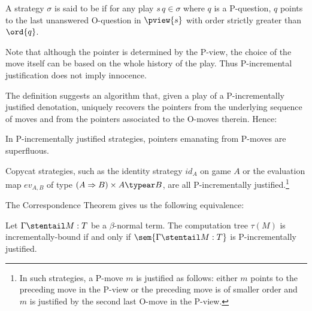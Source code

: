 \begin{definition}\rm
  A strategy $\sigma$ is said to be  if for any play $s \, q \in \sigma$ where $q$ is a
  P-question, $q$ points to the last unanswered O-question in $\pview{s}$ with
  order strictly greater than $\ord{q}$.
\end{definition}
Note that although the pointer is determined by the P-view, the
choice of the move itself can be based on the whole history of the
play. Thus P-incremental justification does not imply innocence.

The definition suggests an algorithm that, given a play of a
P-incrementally justified denotation, uniquely recovers the pointers
from the underlying sequence of moves and from the pointers
associated to the O-moves therein. Hence:
\begin{lemma}
\label{lem:incrjustified_pointers_uniqu_recover} In P-incrementally
justified strategies, pointers emanating from P-moves are
superfluous.
\end{lemma}

\begin{example}
Copycat strategies, such as the identity strategy $id_A$ on game $A$
or the evaluation map $ev_{A,B}$ of type $(A \Rightarrow B) \times A
\typear B$, are all P-incrementally justified.\footnote{In such
strategies, a P-move $m$ is justified as follows: either $m$ points
to the preceding move in the P-view or the preceding move is of
smaller order and $m$ is justified by the second last O-move in the
P-view.}
\end{example}
%



The Correspondence Theorem
gives us the following equivalence:
\begin{proposition} %
\label{prop:Nher_incrbound_and_incrjustified} Let $\Gamma \stentail
M : T$ be a $\beta$-normal term. The computation tree $\tau(M)$ is
incrementally-bound if and only if $\sem{\Gamma \stentail M : T}$ is
P-incrementally justified.
\end{proposition}


